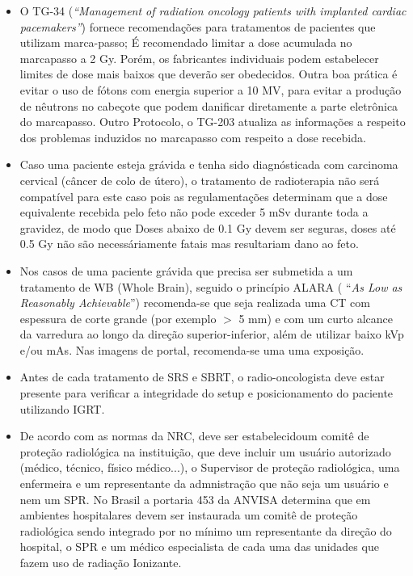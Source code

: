 \documentclass[11pt,a4paper]{article}
\newcounter{exemplo}
\begin{document}
\begin{exemplo}[11. Qualidade ]
\begin{itemize}
        \item O TG-34 (\textit{``Management of radiation oncology patients with implanted cardiac pacemakers''}) fornece recomendações para tratamentos de pacientes que utilizam marca-passo; É recomendado limitar a dose acumulada no marcapasso a 2 Gy. Porém, os fabricantes individuais podem estabelecer limites de dose mais baixos que deverão ser obedecidos. Outra boa prática é evitar o uso de fótons com energia superior a 10 MV, para evitar a produção de nêutrons no cabeçote que podem danificar diretamente a parte eletrônica do marcapasso.  Outro Protocolo, o TG-203 atualiza as informações a respeito dos problemas induzidos no marcapasso com respeito a dose recebida.

        \item Caso uma paciente esteja grávida e tenha sido diagnósticada com carcinoma cervical (câncer de colo de útero), o tratamento de radioterapia não será compatível para este caso pois as regulamentações determinam que a dose equivalente recebida pelo feto não pode exceder 5 mSv durante toda a gravidez, de modo que Doses abaixo de 0.1 Gy devem ser seguras, doses até 0.5 Gy não são necessáriamente fatais mas resultariam dano ao feto. 
        
        \item Nos casos de uma paciente grávida que precisa ser submetida a um tratamento de WB (Whole Brain), seguido o princípio ALARA ( ``\textit{As Low as Reasonably Achievable}'') recomenda-se que seja realizada uma CT com espessura de corte grande (por exemplo $>$ 5 mm) e com um curto alcance da varredura ao longo da direção superior-inferior, além de utilizar baixo kVp e/ou mAs. Nas imagens de portal, recomenda-se uma uma exposição.
        
        \item Antes de cada tratamento de SRS e SBRT, o radio-oncologista deve estar presente para verificar a integridade do setup e posicionamento do paciente utilizando IGRT.

        \item De acordo com as normas da NRC, deve ser estabelecidoum comitê de proteção radiológica na instituição, que deve incluir um usuário autorizado (médico, técnico, físico médico...), o Supervisor de proteção radiológica, uma enfermeira e um representante da admnistração que não seja um usuário e nem um SPR. No Brasil a portaria 453 da ANVISA determina que em ambientes hospitalares devem ser instaurada um comitê de proteção radiológica sendo integrado por no mínimo um representante da direção do hospital, o SPR e um médico especialista de cada uma das unidades que fazem uso de radiação Ionizante. 
        

\end{itemize}
\end{exemplo}
\end{document}
